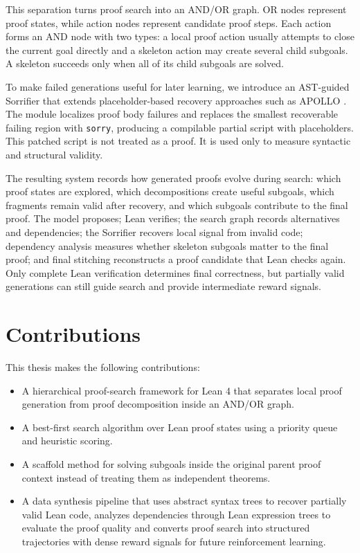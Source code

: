 \documentclass[en]{uet_awesome_thesis/uet-awesome-thesis}
\begin{document}
This separation turns proof search into an AND/OR graph. OR nodes represent proof states, while action nodes represent candidate proof steps. Each action forms an AND node with two types: a local proof action usually attempts to close the current goal directly and a skeleton action may create several child subgoals. A skeleton succeeds only when all of its child subgoals are solved.

To make failed generations useful for later learning, we introduce an AST-guided Sorrifier that extends placeholder-based recovery approaches such as APOLLO \cite{apollo}. The module localizes proof body failures and replaces the smallest recoverable failing region with \texttt{sorry}, producing a compilable partial script with placeholders. This patched script is not treated as a proof. It is used only to measure syntactic and structural validity.

The resulting system records how generated proofs evolve during search: which proof states are explored, which decompositions create useful subgoals, which fragments remain valid after recovery, and which subgoals contribute to the final proof.
The model proposes; Lean verifies; the search graph records alternatives and dependencies; the
Sorrifier recovers local signal from invalid code; dependency analysis measures whether skeleton
subgoals matter to the final proof; and final stitching reconstructs a proof candidate that Lean checks
again. Only complete Lean verification determines final correctness, but partially valid generations can still guide search and provide intermediate reward signals.

\section{Contributions}

This thesis makes the following contributions:

\begin{itemize}
    \item A hierarchical proof-search framework for Lean 4 that separates local proof generation from proof decomposition inside an AND/OR graph.

    \item A best-first search algorithm over Lean proof states using a priority queue and heuristic scoring.
    
    \item A scaffold method for solving subgoals inside the original parent proof context instead of treating them as independent theorems.
    
    \item A data synthesis pipeline that uses abstract syntax trees to recover partially valid Lean code, analyzes dependencies through Lean expression trees to evaluate the proof quality and converts proof search into structured trajectories with dense reward signals for future reinforcement learning.
\end{itemize}
\end{document}
